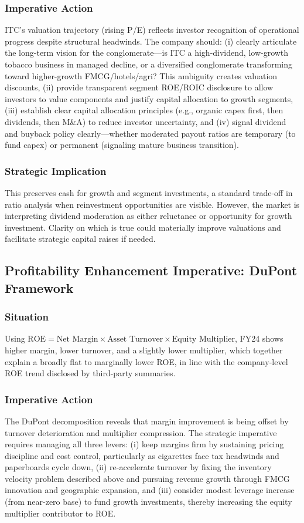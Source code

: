 \documentclass[12pt, a4paper]{report}
\begin{document}
\subsubsection{Imperative Action}
ITC's valuation trajectory (rising P/E) reflects investor recognition of operational progress despite structural headwinds. The company should: (i) clearly articulate the long-term vision for the conglomerate—is ITC a high-dividend, low-growth tobacco business in managed decline, or a diversified conglomerate transforming toward higher-growth FMCG/hotels/agri? This ambiguity creates valuation discounts, (ii) provide transparent segment ROE/ROIC disclosure to allow investors to value components and justify capital allocation to growth segments, (iii) establish clear capital allocation principles (e.g., organic capex first, then dividends, then M\&A) to reduce investor uncertainty, and (iv) signal dividend and buyback policy clearly—whether moderated payout ratios are temporary (to fund capex) or permanent (signaling mature business transition).

\subsubsection{Strategic Implication}
This preserves cash for growth and segment investments, a standard trade-off in ratio analysis when reinvestment opportunities are visible. However, the market is interpreting dividend moderation as either reluctance or opportunity for growth investment. Clarity on which is true could materially improve valuations and facilitate strategic capital raises if needed.

\subsection{Profitability Enhancement Imperative: DuPont Framework}

\subsubsection{Situation}
Using $\text{ROE} = \text{Net Margin} \times \text{Asset Turnover} \times \text{Equity Multiplier}$, FY24 shows higher margin, lower turnover, and a slightly lower multiplier, which together explain a broadly flat to marginally lower ROE, in line with the company-level ROE trend disclosed by third-party summaries.

\subsubsection{Imperative Action}
The DuPont decomposition reveals that margin improvement is being offset by turnover deterioration and multiplier compression. The strategic imperative requires managing all three levers: (i) keep margins firm by sustaining pricing discipline and cost control, particularly as cigarettes face tax headwinds and paperboards cycle down, (ii) re-accelerate turnover by fixing the inventory velocity problem described above and pursuing revenue growth through FMCG innovation and geographic expansion, and (iii) consider modest leverage increase (from near-zero base) to fund growth investments, thereby increasing the equity multiplier contributor to ROE.
\end{document}

